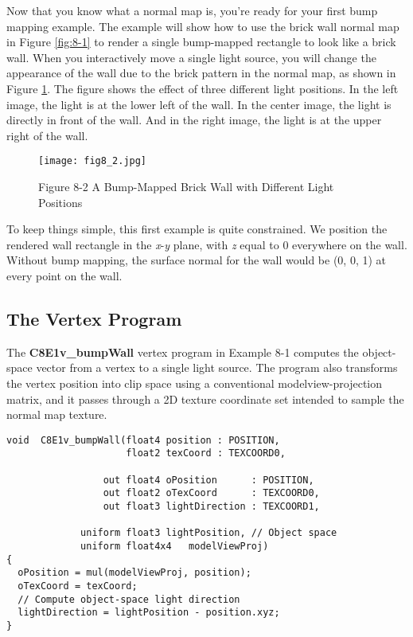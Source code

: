 \documentclass[../main.tex]{subfiles}
\begin{document}
Now that you know what a normal map is, you're ready for your first bump mapping example. The example will show how to use the brick wall normal map in Figure \ref{fig:8-1} to render a single bump-mapped rectangle to look like a brick wall. When you interactively move a single light source, you will change the appearance of the wall due to the brick pattern in the normal map, as shown in Figure \ref{fig:8-2}. The figure shows the effect of three different light positions. In the left image, the light is at the lower left of the wall. In the center image, the light is directly in front of the wall. And in the right image, the light is at the upper right of the wall.

\begin{figure}
    \centering
    \texttt{[image: fig8\_2.jpg]}
    \caption{Figure 8-2 A Bump-Mapped Brick Wall with Different Light Positions}
    \label{fig:8-2}
\end{figure}

To keep things simple, this first example is quite constrained. We position the rendered wall rectangle in the \textit{x}-\textit{y} plane, with \textit{z} equal to 0 everywhere on the wall. Without bump mapping, the surface normal for the wall would be (0, 0, 1) at every point on the wall.

\subsection*{The Vertex Program}

The \textbf{C8E1v_bumpWall} vertex program in Example 8-1 computes the object-space vector from a vertex to a single light source. The program also transforms the vertex position into clip space using a conventional modelview-projection matrix, and it passes through a 2D texture coordinate set intended to sample the normal map texture.

\FloatBarrier
\begin{lstlisting}[caption=Example 8-1. The \textbf{C8E1v_bumpWall} Vertex Program]
void  C8E1v_bumpWall(float4 position : POSITION,
                     float2 texCoord : TEXCOORD0,

                 out float4 oPosition      : POSITION,
                 out float2 oTexCoord      : TEXCOORD0,
                 out float3 lightDirection : TEXCOORD1,

             uniform float3 lightPosition, // Object space
             uniform float4x4   modelViewProj)
{
  oPosition = mul(modelViewProj, position);
  oTexCoord = texCoord;
  // Compute object-space light direction
  lightDirection = lightPosition - position.xyz;
}
\end{lstlisting}
\FloatBarrier
\end{document}

